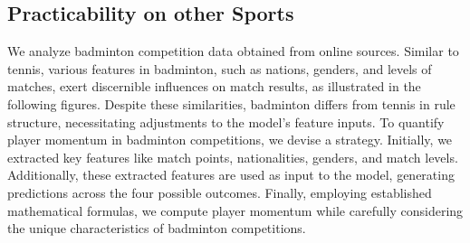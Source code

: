 \documentclass{mcmthesis}
\begin{document}
\subsection{Practicability on other Sports}
We analyze badminton competition data obtained from online sources. Similar to tennis, various features in badminton, such as nations, genders, and levels of matches, exert discernible influences on match results, as illustrated in the following figures.
Despite these similarities, badminton differs from tennis in rule structure, necessitating adjustments to the model's feature inputs. To quantify player momentum in badminton competitions, we devise a strategy. Initially, we extracted key features like match points, nationalities, genders, and match levels. Additionally, these extracted features are used as input to the model, generating predictions across the four possible outcomes. Finally, employing established mathematical formulas, we compute player momentum while carefully considering the unique characteristics of badminton competitions.
\end{document}
